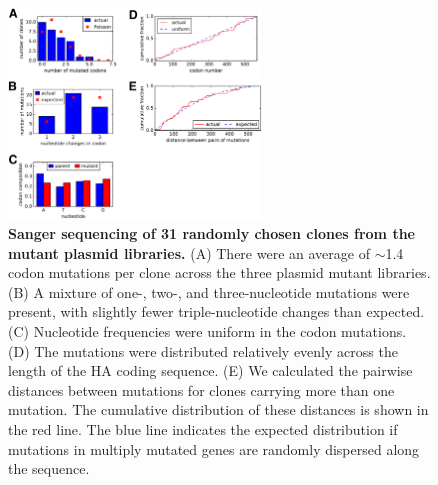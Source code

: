 \documentclass[9pt,twoside,lineno]{pnas-new}
\begin{document}
\begin{figure}
\centerline{\includegraphics[width=0.6\textwidth]{figs/supp_SangerSeq/SangerSeq.pdf}}
\caption{\label{suppfig:SangerSeq}
{\bf Sanger sequencing of 31 randomly chosen clones from the mutant plasmid libraries.}
(A) There were an average of $\sim$1.4 codon mutations per clone across the three plasmid mutant libraries.
(B) A mixture of one-, two-, and three-nucleotide mutations were present, with slightly fewer triple-nucleotide changes than expected.
(C) Nucleotide frequencies were uniform in the codon mutations.
(D) The mutations were distributed relatively evenly across the length of the HA coding sequence.
(E) We calculated the pairwise distances between mutations for clones carrying more than one mutation.
The cumulative distribution of these distances is shown in the red line.
The blue line indicates the expected distribution if mutations in multiply mutated genes are randomly dispersed along the sequence.
}
\end{figure}
\FloatBarrier
\end{document}
